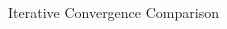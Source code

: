 \documentclass[10pt]{beamer}
\begin{document}
\begin{frame}{Iterative Convergence Comparison}
\begin{columns}
		\begin{column}{.55\textwidth}
		\begin{figure}
			\centering
		\end{figure}
		\end{column}
		\begin{column}{.55\textwidth}
		\begin{figure}
			\centering
		\end{figure}
		\end{column}
	\end{columns}

\end{frame}
\end{document}

